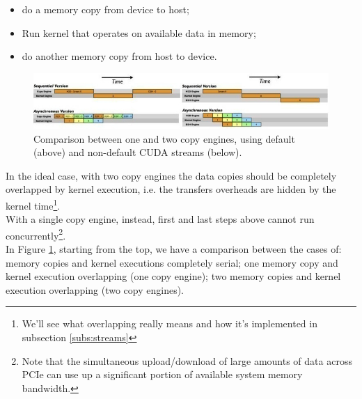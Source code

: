 	\begin{itemize}
		\item do a memory copy from device to host;
		\item Run kernel that operates on available data in memory;
		\item do another memory copy from host to device.
	\end{itemize}
	\begin{figure}[H]
		\centering
		\includegraphics[width=\textwidth]{images/copy-engine.jpg}
		\caption{Comparison between one and two copy engines, using default (above) and non-default CUDA streams (below).}
		\label{fig:copyengines}
	\end{figure}
	In the ideal case, with two copy engines the data copies should be completely overlapped by kernel execution, i.e. the transfers overheads are hidden by the kernel time\footnote{We'll see what overlapping really means and how it's implemented in subsection \ref{subs:streams}}.\\
	With a single copy engine, instead, first and last steps above cannot run concurrently\footnote{Note that the simultaneous upload/download of large amounts of data across PCIe can use up a significant portion of available system memory bandwidth.}\cite{cudahandbook,custreamsblog}.\\
	In Figure \ref{fig:copyengines}, starting from the top, we have a comparison between the cases of: memory copies and kernel executions completely serial; one memory copy and kernel execution overlapping (one copy engine); two memory copies and kernel execution overlapping (two copy engines).\\
		
